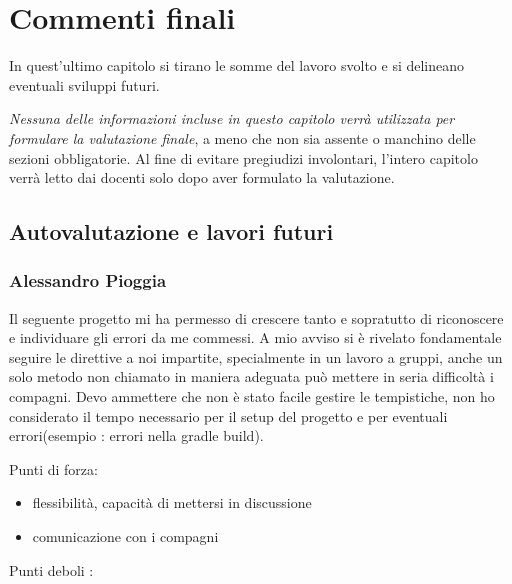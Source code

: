 
\chapter{Commenti finali}

In quest'ultimo capitolo si tirano le somme del lavoro svolto e si delineano eventuali sviluppi
futuri.

\textit{Nessuna delle informazioni incluse in questo capitolo verrà utilizzata per formulare la valutazione finale}, a meno che non sia assente o manchino delle sezioni obbligatorie.
%
Al fine di evitare pregiudizi involontari, l'intero capitolo verrà letto dai docenti solo dopo aver formulato la valutazione.

\section{Autovalutazione e lavori futuri}


\subsection*{Alessandro Pioggia}

Il seguente progetto mi ha permesso di crescere tanto e sopratutto di riconoscere e individuare gli errori da me commessi.
A mio avviso si è rivelato fondamentale seguire le direttive a noi impartite, specialmente in un lavoro a gruppi, anche un solo metodo non chiamato in maniera adeguata può mettere in seria difficoltà i compagni.
Devo ammettere che non è stato facile gestire le tempistiche, non ho considerato il tempo necessario per il setup del progetto e per eventuali errori(esempio : errori nella gradle build).
\\

\begin{flushleft}
	Punti di forza:
\end{flushleft}

\begin{itemize}
	\item flessibilità, capacità di mettersi in discussione
	\item comunicazione con i compagni
\end{itemize}

\begin{flushleft}
	Punti deboli :
\end{flushleft}

